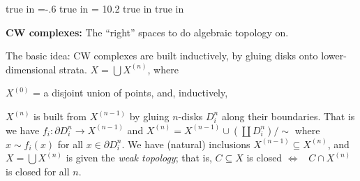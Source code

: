 
\overfullrule=0pt
\parindent=0pt

\nopagenumbers




 true in
\hoffset=-.6 true in
\hsize = 10.2 true in
 true in



\def\cltr{\Red}		  %

\loadmsbm



\def\ctln{\centerline}
\def\u{\underbar}
\def\ssk{\smallskip}
\def\msk{\medskip}
\def\bsk{\bigskip}
\def\hsk{\hskip.1in}
\def\hhsk{\hskip.2in}
\def\dsl{\displaystyle}
\def\hskp{\hskip1.5in}

\def\lra{$\Leftrightarrow$ }
\def\ra{\rightarrow}
\def\mpto{\logmapsto}
\def\pu{\pi_1}
\def\mpu{$\pi_1$}
\def\sig{\Sigma}
\def\msig{$\Sigma$}
\def\ep{\epsilon}
\def\sset{\subseteq}
\def\del{\partial}
\def\inv{^{-1}}
\def\wtl{\widetilde}
\def\del{\partial}
\def\delp{\partial^\prime}
\def\delpp{\partial^{\prime\prime}}
\def\sgn{{\roman{sgn}}}
\def\wtih{\widetilde{H}}
\def\bbz{{\Bbb Z}}
\def\bbr{{\Bbb R}}
\def\rtar{$\Rightarrow$}

\def\cltr{\Red}		  %
\def\cltb{\Blue}		  %
\def\cltg{\PineGreen}	  %



{\bf CW complexes:} The ``right'' spaces to do algebraic topology on.

\msk

The basic idea: CW complexes are built inductively, by gluing 
disks onto lower-dimensional strata. $X=\bigcup X^{(n)}$, where

\ssk

$X^{(0)}$ = a disjoint union of points, and, inductively,

\ssk

$X^{(n)}$ is built from $X^{(n-1)}$ by gluing $n$-disks $D^n_i$
along their boundaries. That is we have $f_i:\del D^n_i\ra X^{(n-1)}$
and $X^{(n)}=X^{(n-1)}\cup(\coprod D^n_i)/\sim$ where
$x\sim f_i(x)$ for all $x\in\del D^n_i$. We have (natural)
inclusions $X^{(n-1)}\subseteq X^{(n)}$, and $X=\bigcup X^{(n)}$
is given the {\it weak topology}; that is,  $C\subseteq X$ is closed \lra\
$C\cap X^{(n)}$ is closed for all $n$. 

